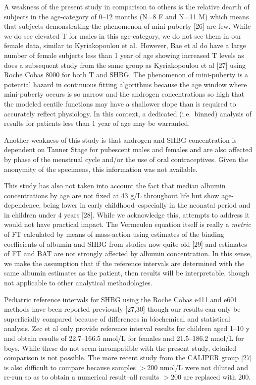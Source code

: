 \documentclass[]{elsarticle} %
\begin{document}
A weakness of the present study in comparison to others is the relative
dearth of subjects in the age-category of 0--12 months (N=8 F and N=11
M) which means that subjects demonstrating the phenomenon of
mini-puberty {[}26{]} are few. While we do see elevated T for males in
this age-category, we do not see them in our female data, similar to
Kyriakopoulou et al.~However, Bae et al do have a large number of female
subjects less than 1 year of age showing increased T levels as does a
subsequent study from the same group as Kyriakopoulou et al {[}27{]}
using Roche Cobas 8000 for both T and SHBG. The phenomenon of
mini-puberty is a potential hazard in continuous fitting algorithms
because the age window where mini-puberty occurs is so narrow and the
androgen concentrations so high that the modeled centile functions may
have a shallower slope than is required to accurately reflect
physiology. In this context, a dedicated (i.e.~binned) analysis of
results for patients less than 1 year of age may be warranted.

Another weakness of this study is that androgen and SHBG concentration
is dependent on Tanner Stage for pubescent males and females and are
also affected by phase of the menstrual cycle and/or the use of oral
contraceptives. Given the anonymity of the specimens, this information
was not available.

This study has also not taken into account the fact that median albumin
concentrations by age are not fixed at 43 g/L throughout life but show
age-dependence, being lower in early childhood--especially in the
neonatal period and in children under 4 years {[}28{]}. While we
acknowledge this, attempts to address it would not have practical
impact. The Vermeulen equation itself is really a \emph{metric} of FT
calculated by means of mass-action using estimates of the binding
coefficients of albumin and SHBG from studies now quite old {[}29{]} and
estimates of FT and BAT are not strongly affected by albumin
concentration. In this sense, we make the assumption that if the
reference intervals are determined with the same albumin estimates as
the patient, then results will be interpretable, though not applicable
to other analytical methodologies.

Pediatric reference intervals for SHBG using the Roche Cobas e411 and
e601 methods have been reported previously {[}27,30{]} though our
results can only be superficially compared because of differences in
biochemical and statistical analysis. Zec et al only provide reference
interval results for children aged 1--10 y and obtain results of
22.7--166.5 nmol/L for females and 21.5--186.2 nmol/L for boys. While
these do not seem incompatible with the present study, detailed
comparison is not possible. The more recent study from the CALIPER group
{[}27{]} is also difficult to compare because samples \(>200\) nmol/L
were not diluted and re-run so as to obtain a numerical result--all
results \(>200\) are replaced with 200.
\end{document}
